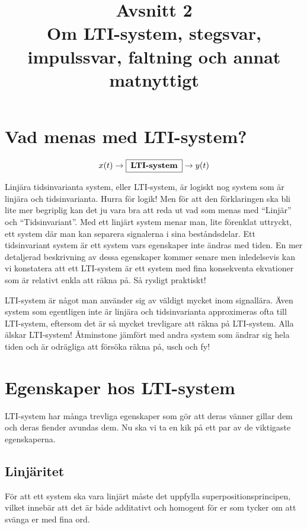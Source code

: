 \documentclass{article}
\title{Avsnitt 2 \\
\large Om LTI-system, stegsvar, impulssvar, faltning och annat matnyttigt}
\author{ }
\date{}
\begin{document}
\maketitle

\section{Vad menas med LTI-system?}
$$x(t) \rightarrow \framebox[1.2\width]{\textbf{LTI-system}} \rightarrow y(t) $$

Linjära tidsinvarianta system, eller LTI-system, är logiskt nog system som är
linjära och tidsinvarianta. Hurra för logik! Men för att den förklaringen ska
bli lite mer begriplig kan det ju vara bra att reda ut vad som menas med
“Linjär” och “Tidsinvariant”. Med ett linjärt system menar man, lite
förenklat uttryckt, ett system där man kan separera signalerna i sina
beståndsdelar. Ett tidsinvariant system är ett system vars egenskaper inte
ändras med tiden. En mer detaljerad beskrivning av dessa egenskaper kommer
senare men inledelsevis kan vi konstatera att ett LTI-system är ett system
med fina konsekventa ekvationer som är relativt enkla att räkna på. Så
rysligt praktiskt!

\newline
LTI-system är något man använder sig av väldigt mycket inom signallära. Även
system som egentligen inte är linjära och tidsinvarianta approximeras ofta
till LTI-system, eftersom det är så mycket trevligare att räkna på
LTI-system. Alla älskar LTI-system! Åtminstone jämfört med andra system som
ändrar sig hela tiden och är odrägliga att försöka räkna på, usch och fy!

\section{Egenskaper hos LTI-system}

LTI-system har många trevliga egenskaper som gör att deras vänner gillar
dem och deras fiender avundas dem. Nu ska vi ta en kik på ett par av de viktigaste egenskaperna.


\subsection{Linjäritet}
För att ett system ska vara linjärt måste det uppfylla
superpositionsprincipen, vilket innebär att det är både  additativt och
homogent för er som tycker om att svänga er med fina ord.
\end{document}
